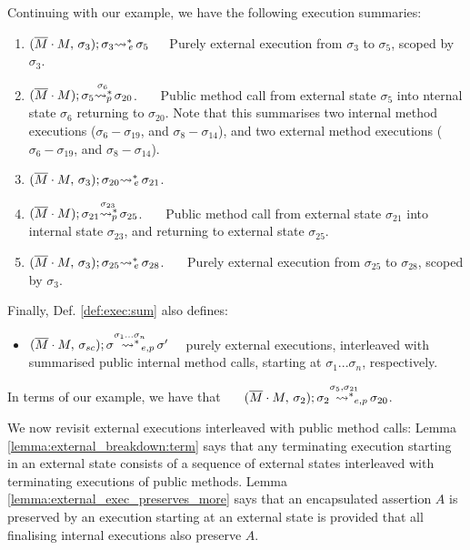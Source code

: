   \noindent
Continuing with our example, we have the following execution summaries:
\begin{enumerate}
\item
${\leadstoBoundedThreeStarExt {\Mtwo\cdot M} {\sigma_3}  {\sigma_3}  {\sigma_5}}$\ \ \ 
Purely external execution from $\sigma_3$ to $\sigma_5$, scoped by $\sigma_3$.
\item
${\WithPub {\Mtwo\cdot M}    {\sigma_5}  {\sigma_{20}} {\sigma_{6}}}$. \ \ \ 
Public method call from external state $\sigma_5$ into  nternal state $\sigma_6$ returning to $\sigma_{20}$. 
Note that this   summarises two  internal method executions ($\sigma_{6}-\sigma_{19}$, and $\sigma_8-\sigma_{14}$),
and two external method executions ($\sigma_{6}-\sigma_{19}$, and $\sigma_8-\sigma_{14}$).
\item
 ${\leadstoBoundedThreeStarExt {\Mtwo\cdot M} {\sigma_3}  {\sigma_{20}}  {\sigma_{21}}}$.
 \item
${\WithPub {\Mtwo\cdot M}    {\sigma_{21}}  {\sigma_{25}} {\sigma_{23}}}$. \ \ \ 
Public method call from  external state ${\sigma_{21}}$ into internal state $\sigma_{23}$, and returning to external state $\sigma_{25}$.
 \item
  ${\leadstoBoundedThreeStarExt {\Mtwo\cdot M} {\sigma_3}  {\sigma_{25}}  {\sigma_{28}}}$.
\ \ \ 
  Purely external execution from $\sigma_{25}$ to $\sigma_{28}$, scoped by ${\sigma_3}$.
\end{enumerate}


\noindent
Finally, Def. \ref{def:exec:sum} also defines:
\begin{itemize}
\item
$\WithExtPub {\Mtwo\cdot M} {\sigma\bd}  {\sigma}  {\sigma'} {\sigma_1...\sigma_n}$  \ \ purely external executions, interleaved with summarised public internal method calls, starting at ${\sigma_1...\sigma_n}$, respectively.
\end{itemize}
\noindent
In terms of our example, we have that \ \ \ $\WithExtPub {\Mtwo\cdot M} {\sigma_2}  {\sigma_{2}}   {\sigma_{20}}  {\sigma_5,\sigma_{21}}$.


\vspace{.1cm}

We now revisit external executions interleaved with public method calls:   
Lemma \ref{lemma:external_breakdown:term} says that any terminating execution
 starting in an external state  consists of a  sequence of  external states interleaved with terminating executions
of public methods.
Lemma  \ref{lemma:external_exec_preserves_more} says that an encapsulated assertion $A$  is preserved by an execution
starting at an external state is provided that all finalising internal executions  %
also preserve $A$. 

